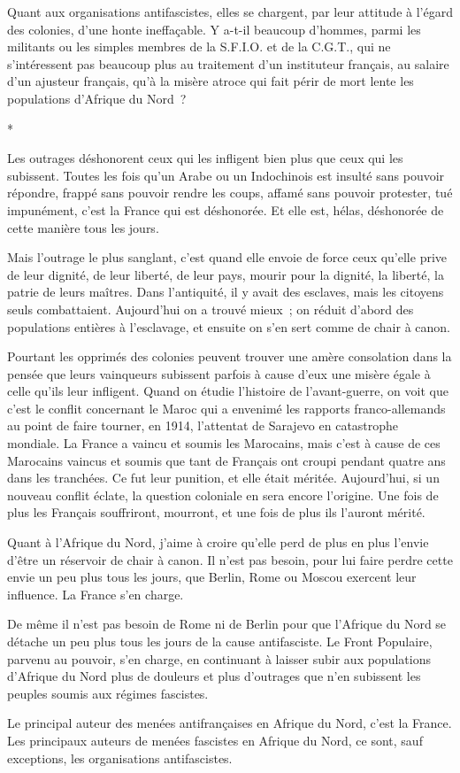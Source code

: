 \documentclass[french,twoside]{book} %
\begin{document}
Quant aux organisations antifascistes, elles se chargent, par leur attitude à l'égard des colonies, d'une honte ineffaçable. Y a-t-il beaucoup d'hommes, parmi les militants ou les simples membres de la S.F.I.O. et de la C.G.T., qui ne s'intéressent pas beaucoup plus au traitement d'un instituteur français, au salaire d'un ajusteur français, qu'à la misère atroce qui fait périr de mort lente les populations d'Afrique du Nord ?\par

\begin{center}
*\end{center}
\noindent Les outrages déshonorent ceux qui les infligent bien plus que ceux qui les subissent. Toutes les fois qu'un Arabe ou un Indochinois est insulté sans pouvoir répondre, frappé sans pouvoir rendre les coups, affamé sans pouvoir protester, tué impunément, c'est la France qui est déshonorée. Et elle est, hélas, déshonorée de cette manière tous les jours.\par
Mais l'outrage le plus sanglant, c'est quand elle envoie de force ceux qu'elle prive de leur dignité, de leur liberté, de leur pays, mourir pour la digni­té, la liberté, la patrie de leurs maîtres. Dans l'antiquité, il y avait des esclaves, mais les citoyens seuls combattaient. Aujourd'hui on a trouvé mieux ; on réduit d'abord des populations entières à l'esclavage, et ensuite on s'en sert comme de chair à canon.\par
Pourtant les opprimés des colonies peuvent trouver une amère consolation dans la pensée que leurs vainqueurs subissent parfois à cause d'eux une misère égale à celle qu'ils leur infligent. Quand on étudie l'histoire de l'avant-guerre, on voit que c'est le conflit concernant le Maroc qui a envenimé les rapports franco-allemands au point de faire tourner, en 1914, l'attentat de Sarajevo en catastrophe mondiale. La France a vaincu et soumis les Marocains, mais c'est à cause de ces Marocains vaincus et soumis que tant de Français ont croupi pendant quatre ans dans les tranchées. Ce fut leur punition, et elle était méritée. Aujourd'hui, si un nouveau conflit éclate, la question coloniale en sera encore l'origine. Une fois de plus les Français souffriront, mourront, et une fois de plus ils l'auront mérité.\par
Quant à l'Afrique du Nord, j'aime à croire qu'elle perd de plus en plus l'envie d'être un réservoir de chair à canon. Il n'est pas besoin, pour lui faire perdre cette envie un peu plus tous les jours, que Berlin, Rome ou Moscou exercent leur influence. La France s'en charge.\par
De même il n'est pas besoin de Rome ni de Berlin pour que l'Afrique du Nord se détache un peu plus tous les jours de la cause antifasciste. Le Front Populaire, parvenu au pouvoir, s'en charge, en continuant à laisser subir aux populations d'Afrique du Nord plus de douleurs et plus d'outrages que n'en subissent les peuples soumis aux régimes fascistes.\par
Le principal auteur des menées antifrançaises en Afrique du Nord, c'est la France. Les principaux auteurs de menées fascistes en Afrique du Nord, ce sont, sauf exceptions, les organisations antifascistes.\par
\end{document}
